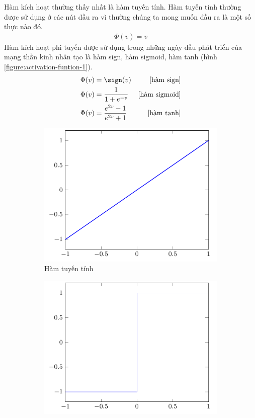Hàm kích hoạt thường thấy nhất là hàm tuyến tính. Hàm tuyến tính thường được sử dụng ở các nút đầu ra vì thường chúng ta mong muốn đầu ra là một số thực nào đó.
\begin{align}
    \Phi(v)=v
\end{align}
Hàm kích hoạt phi tuyến được sử dụng trong những ngày đầu phát triển của mạng thần kinh nhân tạo là hàm sign, hàm sigmoid, hàm tanh (hình \ref{figure:activation-funtion-1}).
\begin{align}
    \Phi(v) & =\sign(v)                   & \text{[hàm sign]}    \\
    \Phi(v) & =\dfrac{1}{1+e^{-v}}        & \text{[hàm sigmoid]} \\
    \Phi(v) & =\dfrac{e^{2v}-1}{e^{2v}+1} & \text{[hàm tanh]}
\end{align}
\begin{figure}[htb]
    \centering
    \begin{subfigure}[b]{0.25\textwidth}
        \centering
        \includegraphics[width=\textwidth]{tikz_image/identity.pdf}
        \caption{Hàm tuyến tính}
    \end{subfigure}%
    \begin{subfigure}[b]{0.25\textwidth}
        \centering
        \includegraphics[width=\textwidth]{tikz_image/sign.pdf}

\end{subfigure}
\end{figure}
